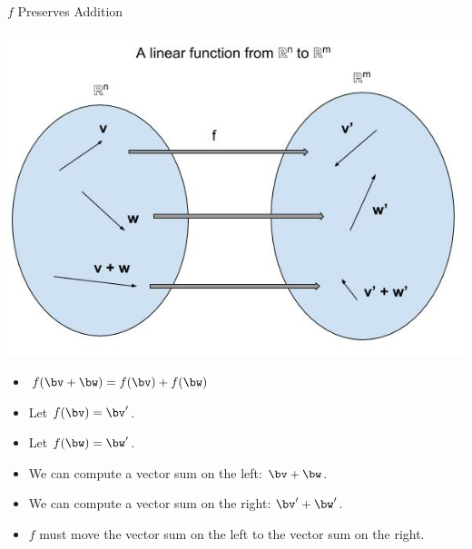 \documentclass{beamer}
\begin{document}
\begin{frame}{$f$ Preserves Addition}

\begin{center}
\includegraphics[scale=0.25]{preserving-addition}
\end{center}

\begin{itemize}
\item $f(\bv + \bw) = f(\bv) + f(\bw)$
\item Let $f(\bv) = \bv^{\prime}$.
\item Let $f(\bw) = \bw^{\prime}$.
\item We can compute a vector sum on the left: $\bv + \bw$.
\item We can compute a vector sum on the right: $\bv^{\prime} + \bw^{\prime}$.
\item $f$ must move the vector sum on the left to the vector sum on the right.
\end{itemize}

\end{frame}
\end{document}
